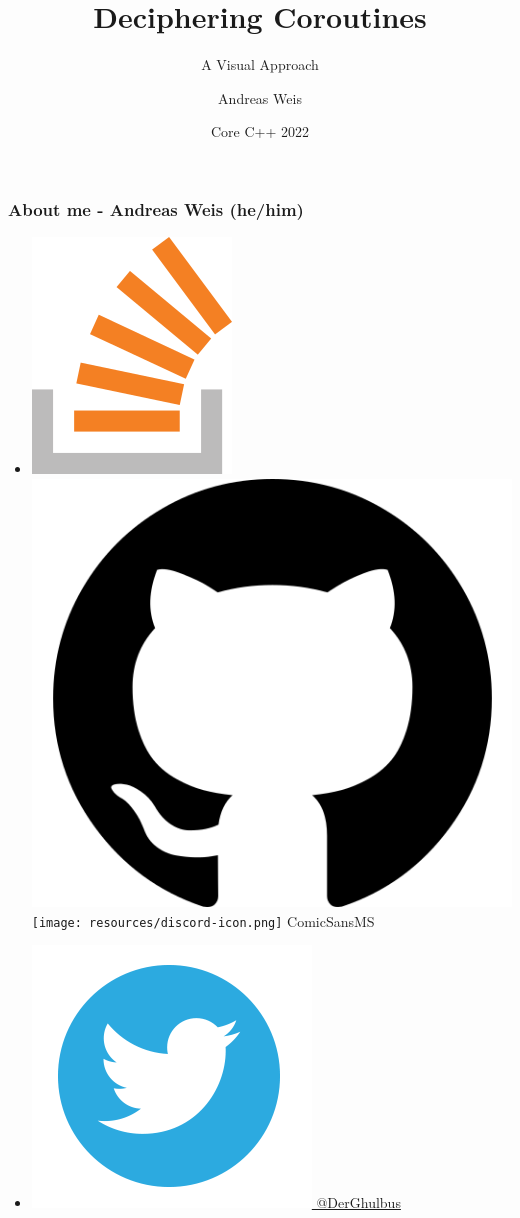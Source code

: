 \documentclass[aspectratio=169]{beamer}
\title{Deciphering Coroutines}
\subtitle{A Visual Approach}
\author{Andreas Weis}
\institute{Woven Planet}
\date{Core C++ 2022}
\begin{document}
\frame{\titlepage}

\iftrue %
\fi

\begin{frame}[fragile]
  \frametitle{About me - Andreas Weis (he/him)}

  \begin{itemize}
    \setlength\itemsep{1.5em}

    \item \href{https://stackoverflow.com/users/577603/comicsansms}{\includegraphics[height=.05\textheight]{resources/so-icon.png}} \href{https://github.com/ComicSansMS}{\includegraphics[height=.05\textheight]{resources/github-icon.png}} \texttt{[image: resources/discord-icon.png]} ComicSansMS

    \item \href{https://twitter.com/DerGhulbus/}{\includegraphics[height=.05\textheight]{resources/twitter-icon.png} @DerGhulbus}


\end{itemize}
\end{frame}
\end{document}

